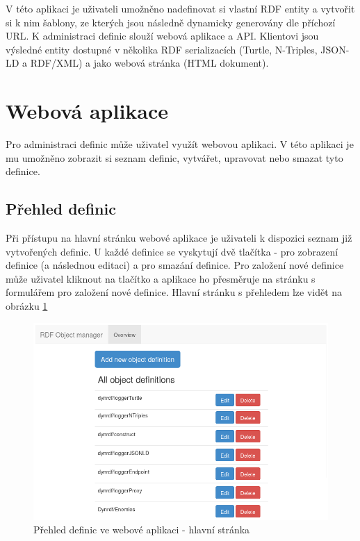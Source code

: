 \documentclass[thesis=B,czech]{FITthesis}[2012/06/26]
\begin{document}
  V této aplikaci je uživateli umožněno nadefinovat si vlastní RDF entity a vytvořit si k nim
  šablony, ze kterých jsou následně dynamicky generovány dle příchozí URL. K administraci definic slouží webová aplikace a API.
  Klientovi jsou výsledné entity dostupné v několika RDF serializacích (Turtle, N-Triples, JSON-LD a RDF/XML) a jako webová stránka (HTML dokument).
  
   
  
  
  \section{Webová aplikace}\label{web_app}
  Pro administraci definic může uživatel využít webovou aplikaci. V této aplikaci je mu umožněno zobrazit si
  seznam definic, vytvářet, upravovat nebo smazat tyto definice.
  
  \subsection{Přehled definic}
  Při přístupu na hlavní stránku webové aplikace je uživateli k dispozici seznam již vytvořených definic. U každé definice se vyskytují dvě tlačítka - pro 
  zobrazení definice (a následnou editaci) a pro smazání definice.
  Pro založení nové definice může uživatel kliknout na tlačítko  a aplikace ho přesměruje na stránku s formulářem pro založení nové definice.
  Hlavní stránku s přehledem lze vidět na obrázku \ref{web_overview}
  \begin{figure}\centering
 	\includegraphics[width=\textwidth]{web_overview}
 	\caption[Přehled definic ve webové aplikaci - hlavní stránka]{Přehled definic ve webové aplikaci - hlavní stránka}\label{web_overview}		
  \end{figure}
    
\end{document}
